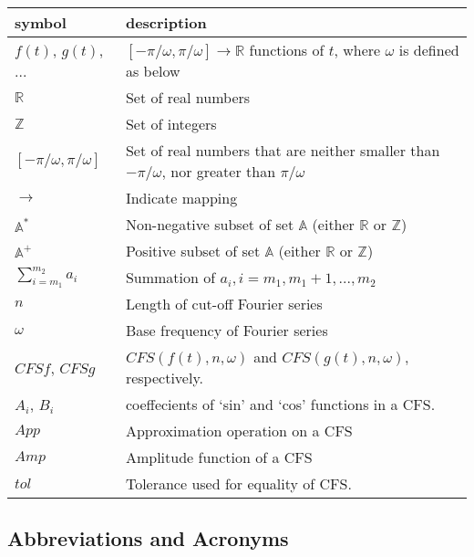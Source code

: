 \documentclass[12pt]{article}
\begin{document}
\renewcommand{\arraystretch}{1.2}
\noindent \begin{longtable*}{l l} \toprule
	\textbf{symbol} & \textbf{description}\\
	\midrule 
	$f(t)$, $g(t)$, ... & $[-\pi/\omega, \pi/\omega]\rightarrow\mathbb{R}$ 
	functions of $t$, where $\omega$ is defined as below\\
	$\mathbb{R}$ & Set of real numbers\\
	$\mathbb{Z}$ & Set of integers\\
	$[-\pi/\omega, \pi/\omega]$ & Set of real numbers that are neither smaller 
	than $-\pi/\omega$, nor greater than $\pi/\omega$ \\
	$\rightarrow$ & Indicate mapping\\
	$\mathbb{A}^{*}$ & Non-negative subset of set $\mathbb{A}$ (either $\mathbb{R}$ 
	or $\mathbb{Z}$)\\
	$\mathbb{A}^{+}$ & Positive subset of set $\mathbb{A}$ (either $\mathbb{R}$ 
	or $\mathbb{Z}$)\\
	$\sum_{i=m_1}^{m_2}a_i$ & Summation of $a_i, i=m_1, m_1+1, ..., m_2$\\
	$n$ & Length of cut-off Fourier series\\ 
	$\omega$ & Base frequency of Fourier series \\
	$\mathit{CFSf}$, $\mathit{CFSg}$ & $\mathit{CFS}(f(t), n, \omega)$ and 
	$\mathit{CFS}(g(t), n, \omega)$, respectively.\\
	$A_i$, $B_i$& coeffecients of `sin' and `cos' functions in a CFS.\\
	$\mathit{App}$& Approximation operation on a CFS\\
	$\mathit{Amp}$& Amplitude function of a CFS\\
	$\mathit{tol}$& Tolerance used for equality of CFS.\\
	\bottomrule
\end{longtable*}

\subsection{Abbreviations and Acronyms}
\end{document}
